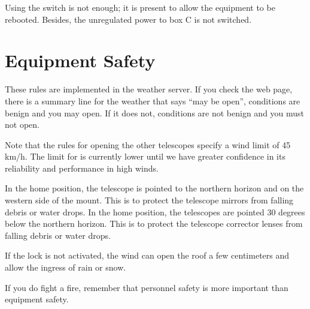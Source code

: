 Using the switch is not enough; it is present to allow the equipment to be rebooted. Besides, the unregulated power to box C is not switched.



\section{Equipment Safety}


These rules are implemented in the {\projectname} weather server. If you check the {\projectname} web page, there is a summary line for the weather that says “may be open”, conditions are benign and you may open. If it does not, conditions are not benign and you must not open.

Note that the rules for opening the other telescopes specify a wind limit of 45 km/h. The limit for {\projectname} is currently lower until we have greater confidence in its reliability and performance in high winds.


\ifcoatlioan
In the home position, the telescope is pointed to the northern horizon and on the western side of the mount. This is to protect the telescope mirrors from falling debris or water drops.
\fi
\ifcoatlioan
In the home position, the telescopes are pointed 30 degrees below the northern horizon. This is to protect the telescope corrector lenses from falling debris or water drops.
\fi



If the lock is not activated, the wind can open the roof a few centimeters and allow the ingress of rain or snow.


If you do fight a fire, remember that personnel safety is more important than equipment safety.

